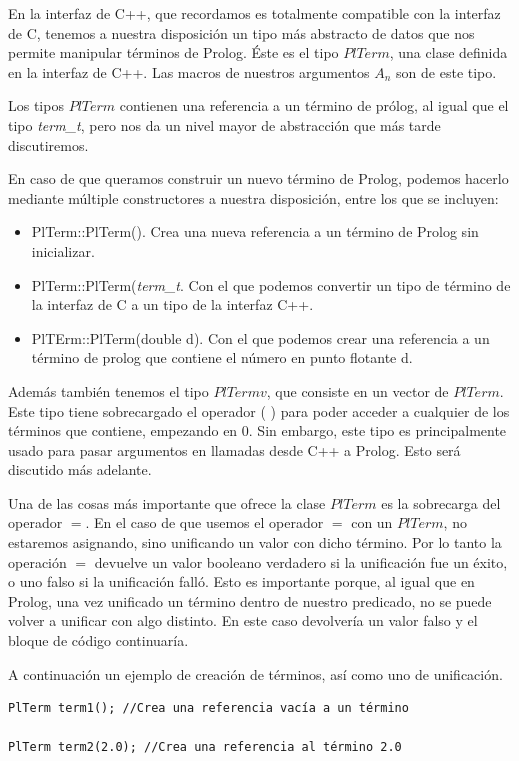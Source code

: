 \documentclass[a4paper,12pt]{article}
\begin{document}
En la interfaz de C++, que recordamos es totalmente compatible con la interfaz de C, tenemos a nuestra disposición un tipo más abstracto de datos que nos permite manipular términos de Prolog. Éste es el tipo $PlTerm$, una clase definida en la interfaz de C++. Las macros de nuestros argumentos $A_n$ son de este tipo.

Los tipos $PlTerm$ contienen una referencia a un término de prólog, al igual que el tipo \textit{term\_t}, pero nos da un nivel mayor de abstracción que más tarde discutiremos. 

En caso de que queramos construir un nuevo término de Prolog, podemos hacerlo mediante múltiple constructores a nuestra disposición, entre los que se incluyen:
\begin{itemize}
\item PlTerm::PlTerm(). Crea una nueva referencia a un término de Prolog sin inicializar.
\item PlTerm::PlTerm(\textit{term\_t}. Con el que podemos convertir un tipo de término de la interfaz de C a un tipo de la interfaz C++.
\item PlTErm::PlTerm(double d). Con el que podemos crear una referencia a un término de prolog que contiene el número en punto flotante d.
\end{itemize}

Además también tenemos el tipo $PlTermv$, que consiste en un vector de $PlTerm$. Este tipo tiene sobrecargado el operador ( ) para poder acceder a cualquier de los términos que contiene, empezando en 0. Sin embargo, este tipo es principalmente usado para pasar argumentos en llamadas desde C++ a Prolog. Esto será discutido más adelante.

Una de las cosas más importante que ofrece la clase $PlTerm$ es la sobrecarga del operador $=$. En el caso de que usemos el operador $=$ con un $PlTerm$, no estaremos asignando, sino unificando un valor con dicho término. Por lo tanto la operación $=$ devuelve un valor booleano verdadero si la unificación fue un éxito, o uno falso si la unificación falló. Esto es importante porque, al igual que en Prolog, una vez unificado un término dentro de nuestro predicado, no se puede volver a unificar con algo distinto. En este caso devolvería un valor falso y el bloque de código continuaría.

A continuación un ejemplo de creación de términos, así como uno de unificación.

\begin{lstlisting}[style=C++]
PlTerm term1(); //Crea una referencia vacía a un término

PlTerm term2(2.0); //Crea una referencia al término 2.0
\end{lstlisting}
\end{document}

